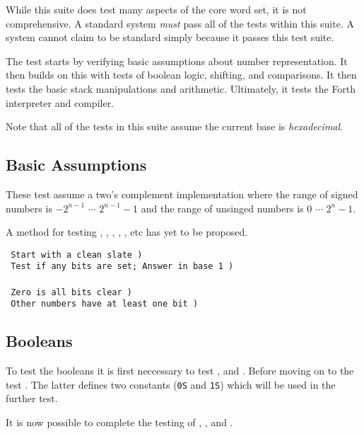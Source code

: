 While this suite does test many aspects of the core word set, it is
not comprehensive.  A standard system \emph{must} pass all of the
tests within this suite.  A system cannot claim to be standard simply
because it passes this test suite.

The test starts by verifying basic assumptions about number
representation.  It then builds on this with tests of boolean logic,
shifting, and comparisons.  It then tests the basic stack manipulations
and arithmetic.  Ultimately, it tests the Forth interpreter and
compiler.

Note that all of the tests in this suite assume the current base is
\emph{hexadecimal}.

\subsection{Basic Assumptions}

These test assume a two's complement implementation where the range of
signed numbers is $-2^{n-1}$ $\cdots$ $2^{n-1}-1$ and the range of
unsinged numbers is $0$ $\cdots$ $2^n-1$.

A method for testing , , ,
, , etc has yet to be proposed.

\test{}{} \tab[10] \texttt{ Start with a clean slate )} \\
\texttt{ Test if any bits are set; Answer in base 1 )} \\
 \\
	\tab[2.8] \texttt{ Zero is all bits clear )} \\
	\tab[1.6] \texttt{ Other numbers have at least one bit )} \\

\subsection{Booleans}

To test the booleans it is first neccessary to test
, and .  Before moving
on to the test .  The latter defines
two constants (\texttt{0S} and \texttt{1S}) which will be used in the
further test.

It is now possible to complete the testing of
	,
	, and
	.

